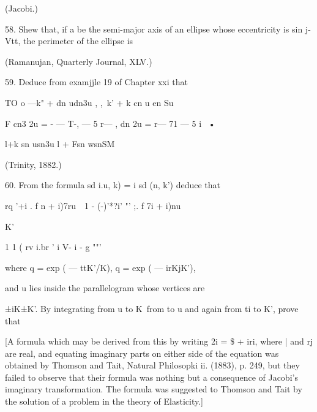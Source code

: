 (Jacobi.)

58. Shew that, if a be the semi-major axis of an ellipse whose
eccentricity is sin j-Vtt, the perimeter of the ellipse is

(Ramanujan, Quarterly Journal, XLV.)

59. Deduce from examjjle 19 of Chapter xxi that

TO o —k" + dn udn3u , ,\ k' + k cn u en Su

F cn3 2u = - — T-, — 5 r— , dn 2u = r— 71 — 5 i~ •

l+k sn usn3u l + Fsn wsnSM

(Trinity, 1882.)

60. From the formula sd i.u, k) = i sd (n, k') deduce that

rq '+i . f n + i)7ru\ \ 1 - (-)'*?i' "' ;. f 7i + i)nu

K'



1 1 ( rv i.br ' i V- i - g ""'



where q = exp ( — ttK'/K), q = exp ( — irKjK'),

and u lies inside the parallelogram whose vertices are

±iK±K'. By integrating from u to K\ from to u and again from ti to K',
prove that

[A formula which may be derived from this by writing 2i = \$ + iri,
where | and rj are real, and equating imaginary parts on either side
of the equation was obtained by Thomson and Tait, Natural Philosopki
ii. (1883), p. 249, but they failed to observe that their formula was
nothing but a consequence of Jacobi's imaginary transformation. The
formula was suggested to Thomson and Tait by the solution of a problem
in the theory of Elasticity.]


